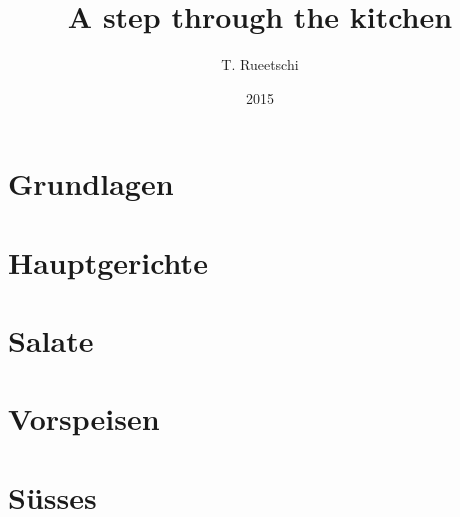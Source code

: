 \documentclass[
  a5paper,
  ngerman,
  10pt,
]{spcookbook}
\title{A step through the kitchen}
\author{T. Rueetschi}
\date{2015}
\begin{document}
\Titlepage
\tableofcontents

\section{Grundlagen}


\section{Hauptgerichte}








\section{Salate}


\section{Vorspeisen}



\section{S\"usses}


\newpage


\end{document}
